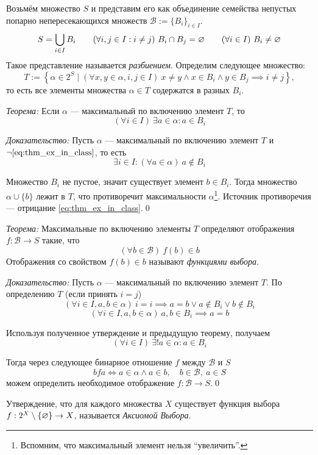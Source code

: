 \newcommand\B{\mathcal B}
Возьмём множество $S$ и представим его как объединение семейства непустых
попарно непересекающихся множеств $\B:=\{B_{i}\}_{i\in I}$.
\[
	S=\bigcup_{i\in I}B_{i}\qquad
	(\forall i,j\in I:i\neq j)~B_{i}\cap B_{j}=\varnothing\qquad
	(\forall i\in I)~B_{i}\neq\varnothing
\]
Такое представление называется {\it разбиением}.
Определим следующее множество:
\[
	T:=\left\{\alpha\in 2^{S}\;\big|\; (\forall x,y\in\alpha,i,j\in I)~
	x\neq y\land	x\in B_{i}\land y\in B_{j}\implies i\neq j\right\},
\]
то есть все элементы множества $\alpha\in T$ содержатся в разных $B_{i}$.

\vspace{1em}
{\it Теорема:} Если $\alpha$ --- максимальный по включению элемент $T$, то
\begin{equation}\label{eq:thm_ex_in_class}
	(\forall i\in I)~\exists a\in\alpha:a\in B_{i}
\end{equation}

{\it Доказательство:}
Пусть $\alpha$ --- максимальный по включению элемент $T$ и
$\lnot\eqref{eq:thm_ex_in_class}$, то есть
\[
	\exists i\in I:(\forall a\in\alpha)~a\notin B_{i}
\]

Множество $B_{i}$ не пустое, значит существует элемент $b\in B_{i}$.
Тогда множество $\alpha\cup \{b\}$ лежит в $T$, что противоречит
максимальности $\alpha$\footnote{Вспомним, что максимальный элемент
	нельзя ``увеличить''.}.
Источник противоречия --- отрицание \eqref{eq:thm_ex_in_class}.\qed

\vspace{1em}
{\it Теорема:} Максимальные по включению элементы $T$ определяют
отображения $f:\B\to S$ такие, что
\[
	(\forall b\in\B)~f(b)\in b
\]
Отображения со свойством $f(b)\in b$ называют {\it функциями выбора}.

{\it Доказательство:} Пусть $\alpha$ --- максимальный по включению
элемент $T$.
По определению $T$ (если принять $i=j$)
\[
	(\forall i\in I,a,b\in\alpha)~i=i\implies a=b\lor a\notin B_{i}\lor b\notin B_{i}
\]
\[
	(\forall i\in I,a,b\in\alpha)~a,b\in B_{i}\implies a=b
\]

Используя полученное утверждение и предыдущую теорему, получаем
\[
	(\forall i\in I)~\exists !a\in\alpha:a\in B_{i}
\]

Тогда через следующее бинарное отношение $f$ между $\B$ и $S$
\[
	bfa\iff a\in \alpha\land a\in b,\quad b\in\B,~a\in S
\]
можем определить необходимое отображение $f:\B\to S$.\qed

Утверждение, что для каждого множества $X$ существует функция
выбора $f:2^{X}\setminus\{\varnothing\}\to X$,
называется {\it Аксиомой Выбора}.

